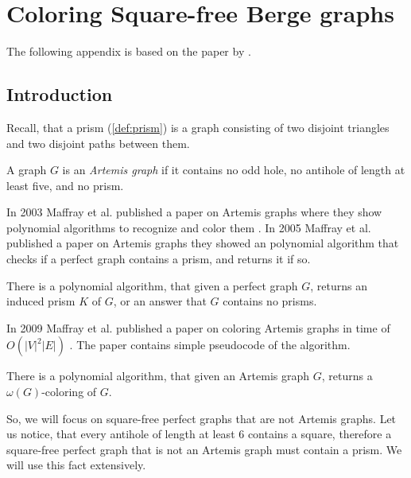 \chapter{Coloring Square-free Berge graphs}
\label{ch:coloringSquareFree}

The following appendix is based on the paper  by \citeauthor{coloringSquareFree} \cite{coloringSquareFree}.

\section{Introduction}

Recall, that a prism (\cref{def:prism}) is a graph consisting of two disjoint triangles and two disjoint paths between them.

\begin{defnTwo}
  A graph $G$ is an \emph{Artemis graph} if it contains no odd hole, no antihole of length at least five, and no prism.
\end{defnTwo}

In 2003 Maffray et al. published a paper on Artemis graphs where they show polynomial algorithms to recognize and color them \cite{Maffray2006}. In 2005 Maffray et al. published a paper on Artemis graphs\cite{Maffray2005} they showed an polynomial algorithm that checks if a perfect graph contains a prism, and returns it if so.

\begin{theorem}{\cite{Maffray2005}}
  \label{thm:getPrism}
  There is a polynomial algorithm, that given a perfect graph $G$, returns an induced prism $K$ of $G$, or an answer that $G$ contains no prisms.
\end{theorem}


In 2009 Maffray et al. published a paper on coloring Artemis graphs in time of $O(|V|^2|E|)$ \cite{coloringArtemis}. The paper contains simple pseudocode of the algorithm.

\begin{theorem}{\cite{coloringArtemis}}
  \label{thm:colorArtemis}
  There is a polynomial algorithm, that given an Artemis graph $G$, returns a $\omega(G)$-coloring of $G$.
\end{theorem}

So, we will focus on square-free perfect graphs that are not Artemis graphs. Let us notice, that every antihole of length at least 6 contains a square, therefore a square-free perfect graph that is not an Artemis graph must contain a prism. We will use this fact extensively.

